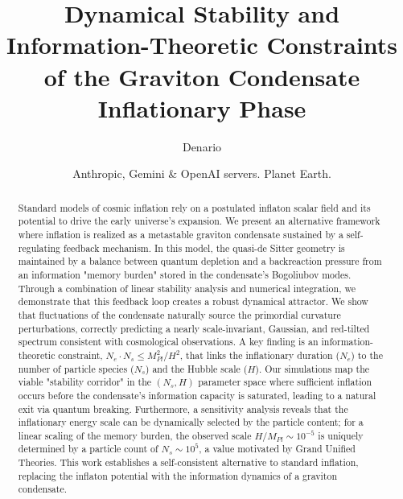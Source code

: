 \documentclass[]{article}
\begin{document}
\title{Dynamical Stability and Information-Theoretic Constraints of the Graviton Condensate Inflationary Phase}

\author{Denario}
\date{Anthropic, Gemini \& OpenAI servers. Planet Earth.}

\maketitle
\begin{abstract}
Standard models of cosmic inflation rely on a postulated inflaton scalar field and its potential to drive the early universe's expansion. We present an alternative framework where inflation is realized as a metastable graviton condensate sustained by a self-regulating feedback mechanism. In this model, the quasi-de Sitter geometry is maintained by a balance between quantum depletion and a backreaction pressure from an information "memory burden" stored in the condensate's Bogoliubov modes. Through a combination of linear stability analysis and numerical integration, we demonstrate that this feedback loop creates a robust dynamical attractor. We show that fluctuations of the condensate naturally source the primordial curvature perturbations, correctly predicting a nearly scale-invariant, Gaussian, and red-tilted spectrum consistent with cosmological observations. A key finding is an information-theoretic constraint, $N_e \cdot N_s \leq M_{Pl}^2/H^2$, that links the inflationary duration ($N_e$) to the number of particle species ($N_s$) and the Hubble scale ($H$). Our simulations map the viable "stability corridor" in the $(N_s, H)$ parameter space where sufficient inflation occurs before the condensate's information capacity is saturated, leading to a natural exit via quantum breaking. Furthermore, a sensitivity analysis reveals that the inflationary energy scale can be dynamically selected by the particle content; for a linear scaling of the memory burden, the observed scale $H/M_{Pl} \sim 10^{-5}$ is uniquely determined by a particle count of $N_s \sim 10^5$, a value motivated by Grand Unified Theories. This work establishes a self-consistent alternative to standard inflation, replacing the inflaton potential with the information dynamics of a graviton condensate.
\end{abstract}
\end{document}

